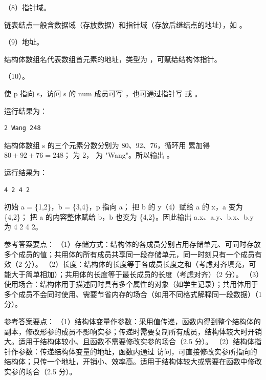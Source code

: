 \documentclass[a4paper,11pt]{article}
\begin{document}
\q （8）指针域。\begin{analysis}链表结点一般含数据域（存放数据）和指针域（存放后继结点的地址），如 。\end{analysis}

\q （9）地址。\begin{analysis}结构体数组名代表数组首元素的地址，类型为 ，可赋给结构体指针。\end{analysis}

\q （10）。\begin{analysis} 使 p 指向 s，访问 s 的 num 成员可写 ，也可通过指针写  或 。\end{analysis}


\q 运行结果为：
\begin{lstlisting}
2 Wang 248
\end{lstlisting}
\begin{analysis}结构体数组 s 的三个元素分数分别为 80、92、76，循环用  累加得 $80+92+76=248$； 为 2， 为 "Wang"。所以输出 。\end{analysis}

\q 运行结果为：
\begin{lstlisting}
4 2 4 2
\end{lstlisting}
\begin{analysis}初始 a = \{1,2\}，b = \{3,4\}，p 指向 a； 把 b 的 y（4）赋给 a 的 x，a 变为 \{4,2\}； 把 a 的内容整体赋给 b，b 也变为 \{4,2\}。因此输出 a.x、a.y、b.x、b.y 为 4 2 4 2。\end{analysis}


\q 参考答案要点：
（1）存储方式：结构体的各成员分别占用存储单元、可同时存放多个成员的值；共用体的所有成员共享同一段存储单元，同一时刻只有一个成员有效（2 分）。
（2）长度：结构体的长度等于各成员长度之和（考虑对齐填充，可能大于简单相加）；共用体的长度等于最长成员的长度（考虑对齐）（2 分）。
（3）使用场合：结构体用于描述同时具有多个属性的对象（如学生记录）；共用体用于多个成员不会同时使用、需要节省内存的场合（如用不同格式解释同一段数据）（1 分）。

\q 参考答案要点：
（1）结构体变量作参数：采用值传递，函数内得到整个结构体的副本，修改形参的成员不影响实参；传递时需要复制所有成员，结构体较大时开销大。适用于结构体较小、且函数不需要修改实参的场合（2.5 分）。
（2）结构体指针作参数：传递结构体变量的地址，函数内通过  访问，可直接修改实参所指向的结构体；只传一个地址，开销小、效率高。适用于结构体较大或需要在函数中修改实参的场合（2.5 分）。
\end{document}
